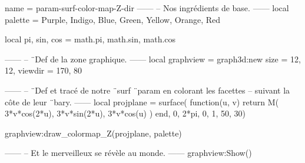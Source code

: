 \documentclass{standalone}
\begin{document}
\begin{luadraw}{name = param-surf-color-map-Z-dir}
------
-- Nos ingrédients de base.
------
local palette = {Purple, Indigo, Blue, Green, Yellow, Orange, Red}

local pi, sin, cos = math.pi, math.sin, math.cos

------
-- ¨Def de la zone graphique.
------
local graphview = graph3d:new{
  size    = {12, 12},
  viewdir = {170, 80}
}

------
-- ¨Def et tracé de notre ¨surf ¨param en colorant les facettes
-- suivant la côte de leur ¨bary.
------
local projplane = surface(
  function(u, v)
    return M(
      3*v*cos(2*u),
      3*v*sin(2*u),
      3*v*cos(u)
    )
  end,
  0, 2*pi, 0, 1,
  {50, 30})

graphview:draw_colormap_Z(projplane, palette)

------
-- Et le merveilleux se révèle au monde.
------
graphview:Show()
\end{luadraw}
\end{document}
